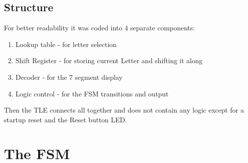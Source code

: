 \documentclass{article}
\begin{document}
\subsection{Structure}
For better readability it was coded into 4 separate components:
\begin{enumerate}
    \item Lookup table - for letter selection
    \item Shift Register - for storing current Letter and shifting it along
    \item Decoder - for the 7 segment display
    \item Logic control - for the FSM transitions and output
\end{enumerate}
Then the TLE connects all together and does not contain any logic except for a startup reset and the Reset button LED.

\section{The FSM}
\end{document}

